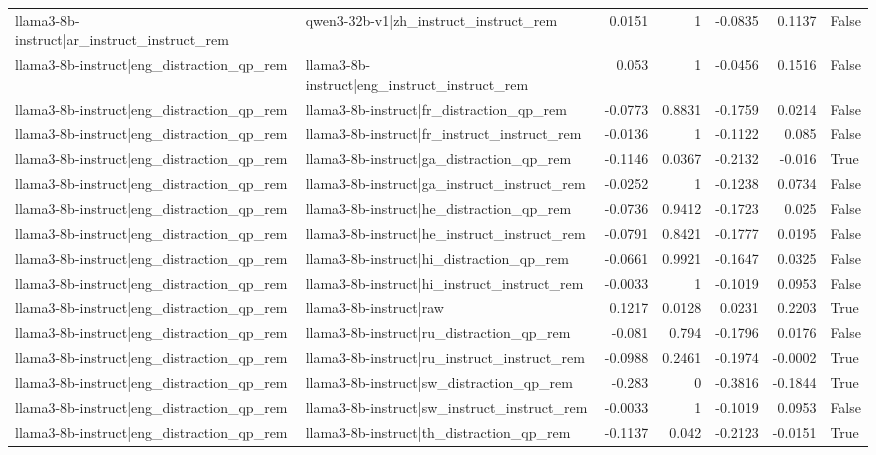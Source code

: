 \begin{table}
\begin{tabular}{l l r r r r l}
llama3-8b-instruct|ar_instruct_instruct_rem & qwen3-32b-v1|zh_instruct_instruct_rem & 0.0151 & 1 & -0.0835 & 0.1137 & False \\
llama3-8b-instruct|eng_distraction_qp_rem & llama3-8b-instruct|eng_instruct_instruct_rem & 0.053 & 1 & -0.0456 & 0.1516 & False \\
llama3-8b-instruct|eng_distraction_qp_rem & llama3-8b-instruct|fr_distraction_qp_rem & -0.0773 & 0.8831 & -0.1759 & 0.0214 & False \\
llama3-8b-instruct|eng_distraction_qp_rem & llama3-8b-instruct|fr_instruct_instruct_rem & -0.0136 & 1 & -0.1122 & 0.085 & False \\
llama3-8b-instruct|eng_distraction_qp_rem & llama3-8b-instruct|ga_distraction_qp_rem & -0.1146 & 0.0367 & -0.2132 & -0.016 & True \\
llama3-8b-instruct|eng_distraction_qp_rem & llama3-8b-instruct|ga_instruct_instruct_rem & -0.0252 & 1 & -0.1238 & 0.0734 & False \\
llama3-8b-instruct|eng_distraction_qp_rem & llama3-8b-instruct|he_distraction_qp_rem & -0.0736 & 0.9412 & -0.1723 & 0.025 & False \\
llama3-8b-instruct|eng_distraction_qp_rem & llama3-8b-instruct|he_instruct_instruct_rem & -0.0791 & 0.8421 & -0.1777 & 0.0195 & False \\
llama3-8b-instruct|eng_distraction_qp_rem & llama3-8b-instruct|hi_distraction_qp_rem & -0.0661 & 0.9921 & -0.1647 & 0.0325 & False \\
llama3-8b-instruct|eng_distraction_qp_rem & llama3-8b-instruct|hi_instruct_instruct_rem & -0.0033 & 1 & -0.1019 & 0.0953 & False \\
llama3-8b-instruct|eng_distraction_qp_rem & llama3-8b-instruct|raw & 0.1217 & 0.0128 & 0.0231 & 0.2203 & True \\
llama3-8b-instruct|eng_distraction_qp_rem & llama3-8b-instruct|ru_distraction_qp_rem & -0.081 & 0.794 & -0.1796 & 0.0176 & False \\
llama3-8b-instruct|eng_distraction_qp_rem & llama3-8b-instruct|ru_instruct_instruct_rem & -0.0988 & 0.2461 & -0.1974 & -0.0002 & True \\
llama3-8b-instruct|eng_distraction_qp_rem & llama3-8b-instruct|sw_distraction_qp_rem & -0.283 & 0 & -0.3816 & -0.1844 & True \\
llama3-8b-instruct|eng_distraction_qp_rem & llama3-8b-instruct|sw_instruct_instruct_rem & -0.0033 & 1 & -0.1019 & 0.0953 & False \\
llama3-8b-instruct|eng_distraction_qp_rem & llama3-8b-instruct|th_distraction_qp_rem & -0.1137 & 0.042 & -0.2123 & -0.0151 & True \\

\end{tabular}
\end{table}
